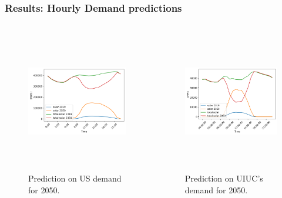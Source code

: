 \begin{frame}
\frametitle{Results: Hourly Demand predictions}
\begin{columns}
    \column[t]{5cm}
	\begin{figure}[htbp!]
		\begin{center}
			\includegraphics[height=6.2cm]{images/duck-curve4}
		\end{center}
		\caption{Prediction on US demand for 2050.}
	\end{figure}

    \column[t]{5cm}
	\begin{figure}[htbp!]
		\begin{center}
			\includegraphics[height=6.2cm]{images/uiuc-duck}
		\end{center}
		\caption{Prediction on UIUC's demand for 2050.}
	\end{figure}
\end{columns}
\end{frame}


